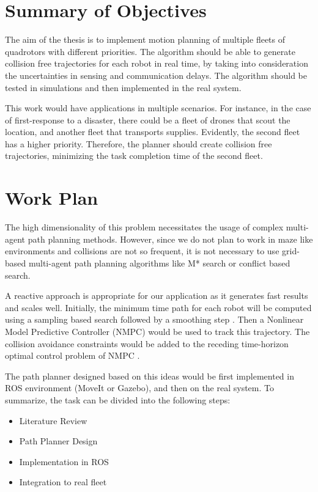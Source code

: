 
\section{Summary of Objectives}
The aim of the thesis is to implement motion planning of multiple fleets of quadrotors with different priorities. The algorithm should be able to generate collision free trajectories for each robot in real time, by taking into consideration the uncertainties in sensing and communication delays. The algorithm should be tested in simulations and then implemented in the real system.

This work would have applications in multiple scenarios. For instance, in the case of first-response to a disaster, there could be a fleet of drones that scout the location, and another fleet that transports supplies. Evidently, the second fleet has a higher priority. Therefore, the planner should create collision free trajectories, minimizing the task completion time of the second fleet.

\section{Work Plan}

The high dimensionality of this problem necessitates the usage of complex multi-agent path planning methods. However, since we do not plan to work in maze like environments and collisions are not so frequent, it is not necessary to use grid-based multi-agent path planning algorithms like M* search or conflict based search. 

A reactive approach is appropriate for our application as it generates fast results and scales well. Initially, the minimum time path for each robot will be computed using a sampling based search followed by a smoothing step \cite{gao2017gradient}. Then a Nonlinear Model Predictive Controller (NMPC) would be used to track this trajectory. The collision avoidance constraints would be added to the receding time-horizon optimal control problem of NMPC \cite{kamel2017robust}. 

The path planner designed based on this ideas would be first implemented in ROS environment (MoveIt or Gazebo), and then on the real system. To summarize, the task can be divided into the following steps:

\begin{itemize}
\item Literature Review
\item Path Planner Design
\item Implementation in ROS
\item Integration to real fleet
\end{itemize}

